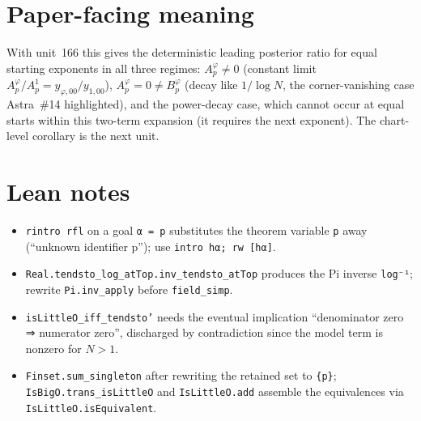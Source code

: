 \documentclass[11pt]{article}
\begin{document}
\section{Paper-facing meaning}
With unit~166 this gives the deterministic leading posterior ratio for equal starting exponents in
all three regimes: $A^\varphi_p\ne0$ (constant limit $A^\varphi_p/A^1_p=y_{\varphi,00}/y_{1,00}$),
$A^\varphi_p=0\ne B^\varphi_p$ (decay like $1/\log N$, the corner-vanishing case Astra~\#14
highlighted), and the power-decay case, which cannot occur at equal starts within this two-term
expansion (it requires the next exponent). The chart-level corollary is the next unit.

\section{Lean notes}
\begin{itemize}
\item \texttt{rintro rfl} on a goal \texttt{α = p} substitutes the theorem variable \texttt{p} away
(``unknown identifier p''); use \texttt{intro hα; rw [hα]}.
\item \texttt{Real.tendsto\_log\_atTop.inv\_tendsto\_atTop} produces the Pi inverse
\texttt{log⁻¹}; rewrite \texttt{Pi.inv\_apply} before \texttt{field\_simp}.
\item \texttt{isLittleO\_iff\_tendsto'} needs the eventual implication ``denominator zero ⇒
numerator zero'', discharged by contradiction since the model term is nonzero for $N>1$.
\item \texttt{Finset.sum\_singleton} after rewriting the retained set to \texttt{\{p\}};
\texttt{IsBigO.trans\_isLittleO} and \texttt{IsLittleO.add} assemble the equivalences via
\texttt{IsLittleO.isEquivalent}.
\end{itemize}
\end{document}
